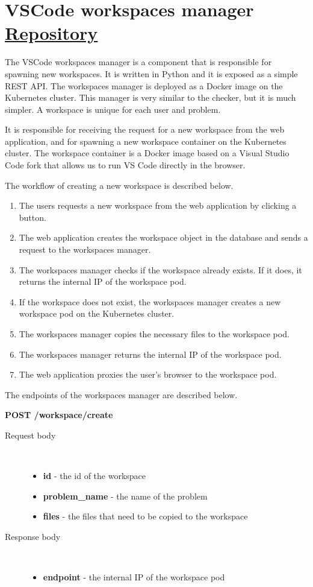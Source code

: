 \documentclass[12pt,a4paper]{report}
\begin{document}
\newpage
\section{VSCode workspaces manager \href{https://github.com/acadnet-dev/workspaces}{ Repository}}
The VSCode workspaces manager is a component that is responsible for spawning new workspaces. It is written in Python and it is exposed as a simple REST API. The workspaces manager is deployed as a Docker image on the Kubernetes cluster. This manager is very similar to the checker, but it is much simpler. A workspace is unique for each user and problem.

It is responsible for receiving the request for a new workspace from the web application, and for spawning a new workspace container on the Kubernetes cluster. The workspace container is a Docker image based on a Visual Studio Code fork that allows us to run VS Code directly in the browser.

The workflow of creating a new workspace is described below.
\begin{enumerate}
	\item The users requests a new workspace from the web application by clicking a button.
	\item The web application creates the workspace object in the database and sends a request to the workspaces manager.
	\item The workspaces manager checks if the workspace already exists. If it does, it returns the internal IP of the workspace pod.
	\item If the workspace does not exist, the workspaces manager creates a new workspace pod on the Kubernetes cluster.
	\item The workspaces manager copies the necessary files to the workspace pod.
	\item The workspaces manager returns the internal IP of the workspace pod.
	\item The web application proxies the user's browser to the workspace pod.
\end{enumerate}

The endpoints of the workspaces manager are described below.

\textbf{POST /workspace/create}
\begin{description}
	\item[Request body]\
		\begin{itemize}
			\item \textbf{id} - the id of the workspace
			\item \textbf{problem\_name} - the name of the problem
			\item \textbf{files} - the files that need to be copied to the workspace
		\end{itemize}
	\item[Response body]\
		\begin{itemize}
			\item \textbf{endpoint} - the internal IP of the workspace pod
		\end{itemize}
\end{description}
\end{document}
